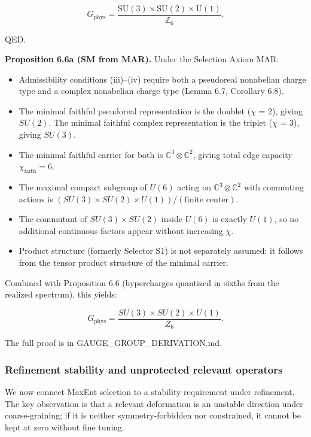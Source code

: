 \documentclass[11pt,a4paper]{article}
\theoremstyle{remark}
\providecommand{\tightlist}{%
  \setlength{\itemsep}{0pt}\setlength{\parskip}{0pt}}
\begin{document}
\[
G_{\mathrm{phys}} = \frac{\mathrm{SU}(3)\times \mathrm{SU}(2)\times \mathrm{U}(1)}{\mathbb Z_6}.
\]

QED.

\textbf{Proposition 6.6a (SM from MAR).} Under the Selection Axiom MAR:

\begin{itemize}
\tightlist
\item
  Admissibility conditions (iii)--(iv) require both a pseudoreal nonabelian
  charge type and a complex nonabelian charge type (Lemma 6.7, Corollary 6.8).
\item
  The minimal faithful pseudoreal representation is the doublet (\ensuremath{\chi} = 2),
  giving \(SU(2)\). The minimal faithful complex representation is the triplet
  (\ensuremath{\chi} = 3), giving \(SU(3)\).
\item
  The minimal faithful carrier for both is \(\mathbb{C}^3 \otimes \mathbb{C}^2\),
  giving total edge capacity \(\chi_{\mathrm{faith}} = 6\).
\item
  The maximal compact subgroup of \(U(6)\) acting on
  \(\mathbb{C}^3 \otimes \mathbb{C}^2\) with commuting actions is
  \((SU(3) \times SU(2) \times U(1))/(\text{finite center})\).
\item
  The commutant of \(SU(3) \times SU(2)\) inside \(U(6)\) is exactly \(U(1)\),
  so no additional continuous factors appear without increasing \(\chi\).
\item
  Product structure (formerly Selector S1) is not separately assumed: it
  follows from the tensor product structure of the minimal carrier.
\end{itemize}

Combined with Proposition 6.6 (hypercharges quantized in sixths from the
realized spectrum), this yields:

\[
G_{\mathrm{phys}} = \frac{SU(3) \times SU(2) \times U(1)}{Z_6}.
\]

The full proof is in GAUGE\_GROUP\_DERIVATION.md.

\subsubsection{Refinement stability and unprotected relevant operators}\label{refinement-stability-and-unprotected-relevant-operators}

We now connect MaxEnt selection to a stability requirement under refinement.
The key observation is that a relevant deformation is an unstable direction
under coarse-graining; if it is neither symmetry-forbidden nor constrained, it
cannot be kept at zero without fine tuning.
\end{document}
